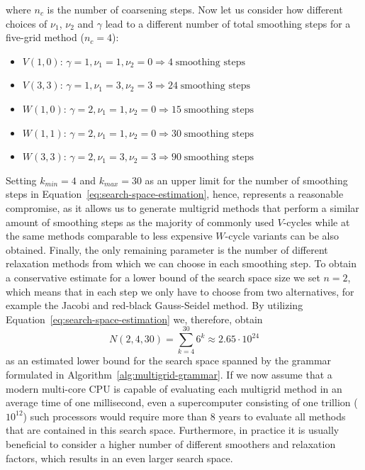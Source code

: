 where $n_c$ is the number of coarsening steps.
Now let us consider how different choices of $\nu_1$, $\nu_2$ and $\gamma$ lead to a different number of total smoothing steps for a five-grid method ($n_c = 4$):
\begin{itemize}
	\item $V(1,0)$: $\gamma = 1, \nu_1 = 1, \nu_2 = 0 \Rightarrow 4 \; \text{smoothing steps}$
	\item $V(3,3)$: $\gamma = 1, \nu_1 = 3, \nu_2 = 3 \Rightarrow 24 \; \text{smoothing steps}$
	\item $W(1,0)$: $\gamma = 2, \nu_1 = 1, \nu_2 = 0 \Rightarrow 15 \; \text{smoothing steps}$
	\item $W(1,1)$: $\gamma = 2, \nu_1 = 1, \nu_2 = 0 \Rightarrow 30 \; \text{smoothing steps}$
	\item $W(3,3)$: $\gamma = 2, \nu_1 = 3, \nu_2 = 3 \Rightarrow 90 \; \text{smoothing steps}$
\end{itemize}
Setting $k_{min} = 4$ and $k_{max} = 30$ as an upper limit for the number of smoothing steps in Equation~\ref{eq:search-space-estimation}, hence, represents a reasonable compromise, as it allows us to generate multigrid methods that perform a similar amount of smoothing steps as the majority of commonly used $V$-cycles while at the same methods comparable to less expensive $W$-cycle variants can be also obtained.
Finally, the only remaining parameter is the number of different relaxation methods from which we can choose in each smoothing step.
To obtain a conservative estimate for a lower bound of the search space size we set $n = 2$, which means that in each step we only have to choose from two alternatives, for example the Jacobi and red-black Gauss-Seidel method.
By utilizing Equation~\eqref{eq:search-space-estimation} we, therefore, obtain 
\begin{equation*}
	N(2, 4, 30) = \sum_{k = 4}^{30} 6^k \approx 2.65 \cdot 10^{24}
\end{equation*}
as an estimated lower bound for the search space spanned by the grammar formulated in Algorithm~\ref{alg:multigrid-grammar}.
If we now assume that a modern multi-core CPU is capable of evaluating each multigrid method in an average time of one millisecond,
even a supercomputer consisting of one trillion ($10^{12}$) such processors would require more than 8 years to evaluate all methods that are contained in this search space.
Furthermore, in practice it is usually beneficial to consider a higher number of different smoothers and relaxation factors, which results in an even larger search space.
